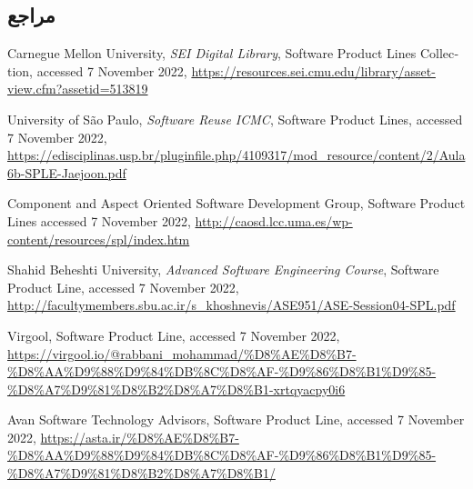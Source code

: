 {\begin{enumerate}
\end{enumerate}

\subsection*{مراجع}

\begin{latin}
	\begingroup
	\renewcommand{\section}[2]{}%
	
\begin{thebibliography}{9}

	Carnegue Mellon University,
	\textit{SEI Digital Library},
	Software Product Lines Collection, 
	accessed 7 November 2022,
	\url{https://resources.sei.cmu.edu/library/asset-view.cfm?assetid=513819}
	
	University of São Paulo,
	\textit{Software Reuse ICMC},
	Software Product Lines, 
	accessed 7 November 2022,
	\url{https://edisciplinas.usp.br/pluginfile.php/4109317/mod_resource/content/2/Aula6b-SPLE-Jaejoon.pdf}
	
	Component and Aspect Oriented Software Development Group,
	Software Product Lines
	accessed 7 November 2022,
	\url{http://caosd.lcc.uma.es/wp-content/resources/spl/index.htm}
	
	Shahid Beheshti University,
	\textit{Advanced Software Engineering Course},
	Software Product Line, 
	accessed 7 November 2022,
	\url{http://facultymembers.sbu.ac.ir/s_khoshnevis/ASE951/ASE-Session04-SPL.pdf}

	Virgool,
	Software Product Line, 
	accessed 7 November 2022,
	\url{https://virgool.io/@rabbani\_mohammad/\%D8\%AE\%D8\%B7-\%D8\%AA\%D9\%88\%D9\%84\%DB\%8C\%D8\%AF-\%D9\%86\%D8\%B1\%D9\%85-\%D8\%A7\%D9\%81\%D8\%B2\%D8\%A7\%D8\%B1-xrtqyacpy0i6}
	
	Avan Software Technology Advisors,
	Software Product Line, 
	accessed 7 November 2022,
	\url{https://asta.ir/\%D8\%AE\%D8\%B7-\%D8\%AA\%D9\%88\%D9\%84\%DB\%8C\%D8\%AF-\%D9\%86\%D8\%B1\%D9\%85-\%D8\%A7\%D9\%81\%D8\%B2\%D8\%A7\%D8\%B1/}
	
	
\end{thebibliography}
\endgroup
\end{latin}

}
